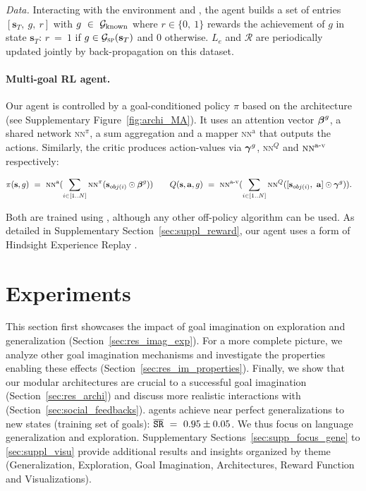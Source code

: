 \textit{Data.} 
Interacting with the environment and \SP, the agent builds a set of entries $[\mathbf{s}_T,~ g,~ r]$ with $g~\in~\mathcal{G}_\text{known}$ where $r \in \{0,~1\}$ rewards the achievement of $g$ in state $\mathbf{s}_T$: $r~=~1$ if $g \in \mathcal{G}_\text{\textsc{sp}}(\mathbf{s}_T)$ and $0$ otherwise. $L_e$ and $\mathcal{R}$ are periodically updated jointly by back-propagation on this dataset.



\paragraph{Multi-goal RL agent.} Our agent is controlled by a goal-conditioned policy $\pi$ \cite{schaul2015universal} based on the \MA architecture (see Supplementary Figure~\ref{fig:archi_MA}). It uses an attention vector $\boldsymbol{\beta}^g$, a shared network \textsc{nn}$^\pi$, a sum aggregation and a mapper \textsc{nn}$^\text{a}$ that outputs the actions. Similarly, the critic produces action-values via $\boldsymbol{\gamma}^g$, \textsc{nn}$^Q$ and $\textsc{nn}^\text{a-v}$ respectively: 

\begin{align*}
    \pi(\mathbf{s}, g)~&=~\textsc{nn}^\text{a}(\sum_{i \in [1..N]}\textsc{nn}^\pi(\mathbf{s}_{obj(i)} \odot \boldsymbol{\beta}^g)) 
    \qquad 
    Q(\mathbf{s}, \mathbf{a}, g)~=~\textsc{nn}^\text{a-v}(\sum_{i \in [1..N]}\textsc{nn}^Q([\mathbf{s}_{obj(i)},~\mathbf{a}] \odot \boldsymbol{\gamma}^g)).
\end{align*}

Both are trained using \ddpg \cite{lillicrap2015continuous}, although any other off-policy algorithm can be used. As detailed in Supplementary Section~\ref{sec:suppl_reward}, our agent uses a form of Hindsight Experience Replay \cite{andrychowicz2017hindsight}.


\section{Experiments}

This section first showcases the impact of goal imagination on exploration and generalization (Section~\ref{sec:res_imag_exp}). For a more complete picture, we analyze other goal imagination mechanisms and investigate the properties enabling these effects (Section~\ref{sec:res_im_properties}). Finally, we show that our modular architectures are crucial to a successful goal imagination (Section~\ref{sec:res_archi}) and discuss more realistic interactions with \SP (Section~\ref{sec:social_feedbacks}). \imagine agents achieve near perfect generalizations to new states (training set of goals): $\overline{\mathtt{SR}}~=~0.95\pm0.05$. We thus focus on language generalization and exploration. Supplementary Sections~\ref{sec:supp_focus_gene} to \ref{sec:suppl_visu} provide additional results and insights organized by theme (Generalization, Exploration, Goal Imagination, Architectures, Reward Function and Visualizations).

